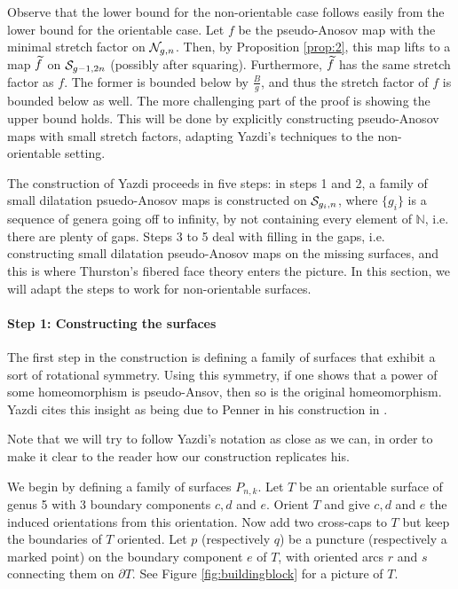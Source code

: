 Observe that the lower bound for the non-orientable case follows easily from the lower bound for the orientable case.
Let $f$ be the pseudo-Anosov map with the minimal stretch factor on $\mathcal{N}_{g,n}$. Then, by Proposition \ref{prop:2},
this map lifts to a map $\widetilde{f}$ on $\mathcal{S}_{g-1, 2n}$ (possibly after squaring). Furthermore, $\widetilde{f}$ has the same
stretch factor as $f$. The former is bounded below by $\frac{B}{g}$, and thus the stretch factor of $f$ is bounded
below as well. The more challenging part of the proof is showing the upper bound holds. This will be done by explicitly
constructing pseudo-Anosov maps with small stretch factors, adapting Yazdi's techniques to the non-orientable setting.

The construction of Yazdi proceeds in five steps: in steps 1 and 2, a family of small dilatation psuedo-Anosov
maps is constructed on $\mathcal{S}_{g_i,n}$, where $\{g_i\}$ is a sequence of genera going off to infinity, by not
containing every element of $\mathbb{N}$, i.e. there are plenty of gaps. Steps 3 to 5 deal with filling in the
gaps, i.e. constructing small dilatation pseudo-Anosov maps on the missing surfaces, and this is where
Thurston's fibered face theory enters the picture. In this section, we will adapt the steps to work for
non-orientable surfaces.

\paragraph{Step 1: Constructing the surfaces}

The first step in the construction is defining a family of surfaces that exhibit a sort of rotational
symmetry. Using this symmetry, if one shows that a power of some homeomorphism is pseudo-Ansov, then so is
the original homeomorphism. Yazdi cites this insight as being due to Penner in his construction in
\cite{penner1991bounds}.

Note that we will try to follow Yazdi's notation as close as we can, in order to make it clear to the reader
how our construction replicates his.

We begin by defining a family of surfaces $P_{n,k}$. Let $T$ be an orientable surface of genus 5 with 3
boundary components $c,d$ and $e$. Orient $T$ and give $c,d$ and $e$ the induced orientations from this
orientation. Now add two cross-caps to $T$ but keep the boundaries of $T$ oriented. Let $p$ (respectively $q$)
be a puncture (respectively a marked point) on the boundary component $e$ of $T$, with oriented arcs $r$ and
$s$ connecting them on $\partial T$. See Figure \ref{fig:buildingblock} for a picture of $T$.

